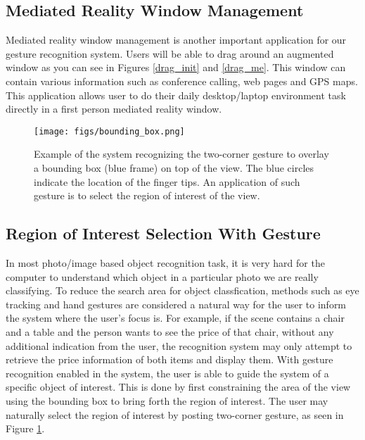 \documentclass[conference]{IEEEtran}
\begin{document}
\subsection{Mediated Reality Window Management}
Mediated reality window management is another important application for our gesture recognition system. Users will be able to drag around an augmented window as you can see in Figures \ref{drag_init} and \ref{drag_me}. This window can contain various information such as conference calling, web pages and GPS maps. This application allows user to do their daily desktop/laptop environment task directly in a first person mediated reality window.
\begin{figure}
\centering
\texttt{[image: figs/bounding\_box.png]} 
\caption{Example of the system recognizing the two-corner gesture to overlay a bounding box (blue frame) on top of the view. The blue circles indicate the location of the finger tips. An application of such gesture is to select the region of interest of the view.} \label{bounding}
\end{figure}

\subsection{Region of Interest Selection With Gesture}
In most photo/image based object recognition task, it is very hard for the computer to understand which object in a particular photo we are really classifying. To reduce the search area for object classfication, methods such as eye tracking \cite{schiessl2003eye} and hand gestures are considered a natural way for the user to inform the system where the user's focus is. For example, if the scene contains a chair and a table and the person wants to see the price of that chair, without any additional indication from the user, the recognition system may only attempt to retrieve the price information of both items and display them. With  gesture recognition enabled in the system, the user is able to guide the system of a specific object of interest. This is done by first constraining the area of the view using the bounding box to bring forth the region of interest. The user may naturally select the region of interest by posting two-corner gesture, as seen in Figure \ref{bounding}.
\end{document}
